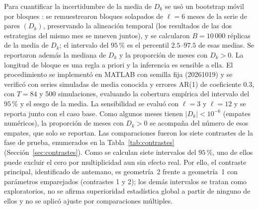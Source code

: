 Para cuantificar la incertidumbre de la media de $D_k$ se usó un bootstrap móvil por bloques \citep{kunsch1989}: se remuestrearon bloques solapados de $\ell=6$ meses de la serie de pares $(D_k)$, preservando la alineación temporal (los resultados de las dos estrategias del mismo mes se mueven juntos), y se calcularon $B=10\,000$ réplicas de la media de $D_k$; el intervalo del $95\,\%$ es el percentil $2.5$--$97.5$ de esas medias. Se reportaron además la mediana de $D_k$ y la proporción de meses con $D_k>0$. La longitud de bloque es una regla a priori y la inferencia es sensible a ella. 
El procedimiento se implementó en MATLAB con semilla fija (20261019) y se verificó con series simuladas de media conocida y errores AR(1) de coeficiente $0.3$, con $T=84$ y 500 simulaciones, evaluando la cobertura empírica del intervalo del $95\,\%$ y el sesgo de la media. La sensibilidad se evaluó con $\ell=3$ y $\ell=12$ y se reporta junto con el caso base. Como algunos meses tienen $|D_k|<10^{-6}$ (empates numéricos), la proporción de meses con $D_k>0$ se acompaña del número de esos empates, que solo se reportan. Las comparaciones fueron los siete contrastes de la fase de prueba, enumerados en la Tabla~\ref{tab:contrastes} (Sección~\ref{sec:contrastes}). Como se calculan siete intervalos del $95\,\%$, uno de ellos puede excluir el cero por multiplicidad aun sin efecto real. Por ello, el contraste principal, identificado de antemano, es geometría~2 frente a geometría~1 con parámetros emparejados (contrastes 1 y 2); los demás intervalos se tratan como exploratorios, no se afirma superioridad estadística global a partir de ninguno de ellos y no se aplicó ajuste por comparaciones múltiples.

